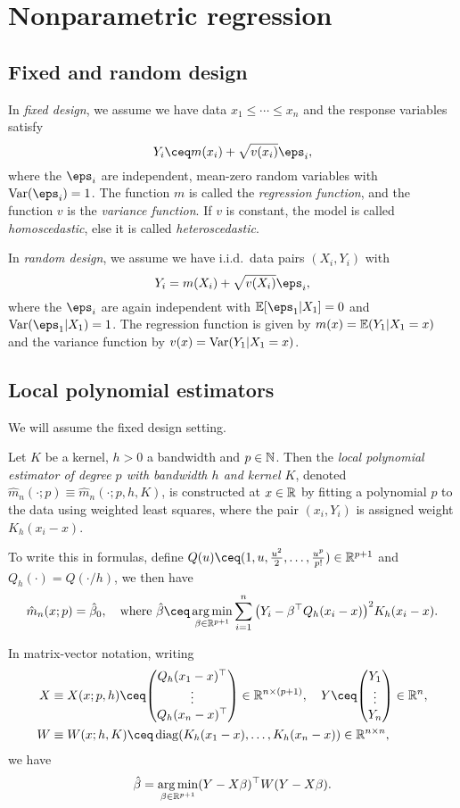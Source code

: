 \section{Nonparametric regression}
\subsection{Fixed and random design}
In \emph{fixed design}, we assume we have data $x_1 \leq \dotsb \leq x_n$ and the response variables satisfy 
\[
Y_i \ceq m(x_i) + \sqrt{v(x_i)} \eps_i,
\]
where the $\eps_i$ are independent, mean-zero random variables with $\Var(\eps_i) = 1$. The function $m$ is called the \emph{regression function}, and the function $v$ is the \emph{variance function}. If $v$ is constant, the model is called \emph{homoscedastic}, else it is called \emph{heteroscedastic}. 

In \emph{random design}, we assume we have i.i.d.\ data pairs $(X_i, Y_i)$ with 
\[
Y_i = m(X_i) + \sqrt{v(X_i)} \eps_i, 
\]
where the $\eps_i$ are again independent with $\EE[\eps_1 | X_1] = 0$ and $\Var(\eps_1 | X_1) = 1$. The regression function is given by $m(x) = \mathbb E(Y_1 | X_1 = x)$ and the variance function by $v(x) = \operatorname{Var}(Y_1 | X_1 = x)$. 

\subsection{Local polynomial estimators}
We will assume the fixed design setting. 
\begin{definition}
	Let $K$ be a kernel, $h > 0$ a bandwidth and $p \in \mathbb N$. Then the \emph{local polynomial estimator of degree $p$ with bandwidth $h$ and kernel $K$}, denoted $\hat m_n (\cdot; p) \equiv \hat m_n(\cdot; p, h, K)$, is constructed at $x \in \mathbb R$ by fitting a polynomial $p$ to the data using weighted least squares, where the pair $(x_i, Y_i)$ is assigned weight $K_h(x_i - x)$. 
\end{definition}

To write this in formulas, define $Q(u) \ceq (1, u, \frac{u^2}{2}, \dotsc, \frac{u^p}{p!}) \in \RR^{p + 1}$ and $Q_h(\cdot) = Q(\cdot/h)$, we then have
\[
\hat m_n(x; p) = \hat\beta_0, \quad\text{where } \hat\beta \ceq \argmin_{\beta \in \RR^{p+1}} \sum_{i=1}^n \qty(Y_i - \beta\T Q_h(x_i - x))^2 K_h(x_i - x). 
\]


In matrix-vector notation, writing 
\begin{align*}
X &\equiv X(x;p, h) \ceq \mqty(Q_h(x_1 - x)\T \\ \vdots \\ Q_h(x_n - x)\T) \in \RR^{n \times (p + 1)}, \quad Y \ceq \mqty(Y_1 \\ \vdots \\ Y_n) \in \RR^n, \\
W&\equiv W(x; h, K) \ceq \diag(K_h(x_1 - x), \dotsc, K_h(x_n - x)) \in \RR^{n \times n}, 
\end{align*}
we have 
\[
\hat\beta = \operatorname*{arg\,min}_{\beta \in \mathbb R^{p+1}} (Y - X\beta)^\top W (Y - X\beta).
\]

